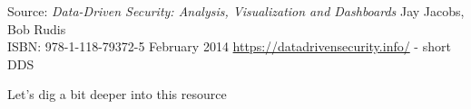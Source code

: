\documentclass[Screen16to9,17pt]{foils}
\begin{document}
Source: \emph{Data-Driven Security: Analysis, Visualization and Dashboards} Jay Jacobs, Bob Rudis\\
ISBN: 978-1-118-79372-5 February 2014 \url{https://datadrivensecurity.info/} - short DDS





Let's dig a bit deeper into this resource

\slidenext{}
\end{document}
